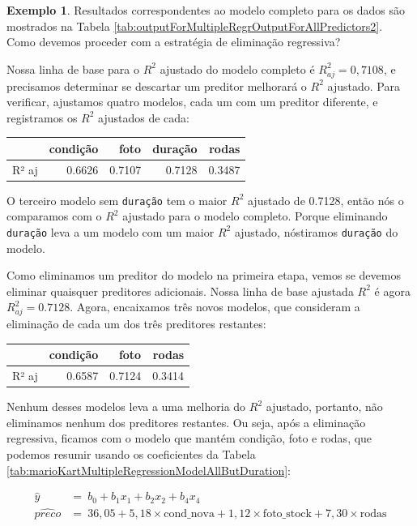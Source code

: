 \documentclass[
]{book}
\theoremstyle{definition}
\theoremstyle{definition}
\newtheorem{example}{Exemplo}[chapter]
\theoremstyle{definition}
\theoremstyle{definition}
\theoremstyle{remark}
\begin{document}
\begin{example}
\protect\hypertarget{exm:backwardEliminationExampleWMarioKartData}{}{\label{exm:backwardEliminationExampleWMarioKartData} }Resultados correspondentes ao modelo completo para os dados são mostrados na Tabela \ref{tab:outputForMultipleRegrOutputForAllPredictors2}. Como devemos proceder com a estratégia de eliminação regressiva?
\end{example}

Nossa linha de base para o \(R^2\) ajustado do modelo completo é \(R^2_{aj} = 0,7108\), e precisamos determinar se descartar um preditor melhorará o \(R^2\) ajustado. Para verificar, ajustamos quatro modelos, cada um com um preditor diferente, e registramos os \(R^2\) ajustados de cada:

\begin{tabular}{l|r|r|r|r}
\hline
  & condição & foto & duração & rodas\\
\hline
R² aj & 0.6626 & 0.7107 & 0.7128 & 0.3487\\
\hline
\end{tabular}

O terceiro modelo sem \texttt{duração} tem o maior \(R^2\) ajustado de 0.7128, então nós o comparamos com o \(R^2\) ajustado para o modelo completo. Porque eliminando \texttt{duração} leva a um modelo com um maior \(R^2\) ajustado, nóstiramos \texttt{duração} do modelo.

Como eliminamos um preditor do modelo na primeira etapa, vemos se devemos eliminar quaisquer preditores adicionais. Nossa linha de base ajustada \(R^2\) é agora \(R^2_{aj} = 0.7128\). Agora, encaixamos três novos modelos, que consideram a eliminação de cada um dos três preditores restantes:

\begin{tabular}{l|r|r|r}
\hline
  & condição & foto & rodas\\
\hline
R² aj & 0.6587 & 0.7124 & 0.3414\\
\hline
\end{tabular}

Nenhum desses modelos leva a uma melhoria do \(R^2\) ajustado, portanto, não eliminamos nenhum dos preditores restantes. Ou seja, após a eliminação regressiva, ficamos com o modelo que mantém condição, foto e rodas, que podemos resumir usando os coeficientes da Tabela \ref{tab:marioKartMultipleRegressionModelAllButDuration}:

\begin{align*}
\hat{y} \ &= \ b_0 + b_1x_1 + b_2x_2 + b_4x_4 \\
\widehat{preco} &= \ 36,05 + 5,18 \times \text{cond\_nova} + 1,12 \times \text{foto\_stock} + 7,30 \times \text{rodas}
\end{align*}
\end{document}
